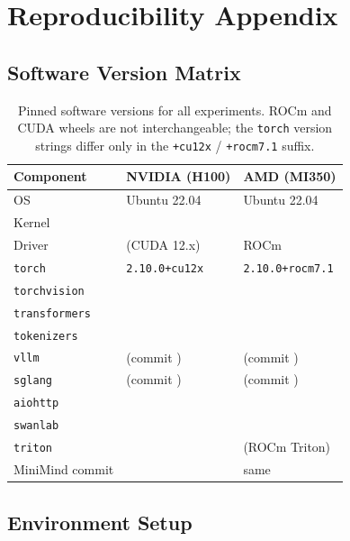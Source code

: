 \appendix

\section{Reproducibility Appendix}
\label{sec:appendix}

\subsection{Software Version Matrix}
\label{sec:appendix:versions}

\begin{table}[h]
\centering
\caption{Pinned software versions for all experiments.  ROCm and CUDA wheels
are not interchangeable; the \texttt{torch} version strings differ only in the
\texttt{+cu12x} / \texttt{+rocm7.1} suffix.}
\label{tab:software_versions}
\small
\begin{tabular}{lll}
\toprule
\textbf{Component} & \textbf{NVIDIA (H100)} & \textbf{AMD (MI350)} \\
\midrule
OS                 & Ubuntu 22.04           & Ubuntu 22.04 \\
Kernel             & \PH{}                  & \PH{} \\
Driver             & \PH{} (CUDA 12.x)      & ROCm \PH{} \\
\texttt{torch}     & \texttt{2.10.0+cu12x}  & \texttt{2.10.0+rocm7.1} \\
\texttt{torchvision} & \PH{}                & \PH{} \\
\texttt{transformers} & \PH{}               & \PH{} \\
\texttt{tokenizers} & \PH{}                 & \PH{} \\
\texttt{vllm}      & \PH{} (commit \PH{})   & \PH{} (commit \PH{}) \\
\texttt{sglang}    & \PH{} (commit \PH{})   & \PH{} (commit \PH{}) \\
\texttt{aiohttp}   & \PH{}                  & \PH{} \\
\texttt{swanlab}   & \PH{}                  & \PH{} \\
\texttt{triton}    & \PH{}                  & \PH{} (ROCm Triton) \\
MiniMind commit    & \PH{}                  & same \\
\bottomrule
\end{tabular}
\end{table}

\subsection{Environment Setup}
\label{sec:appendix:setup}

